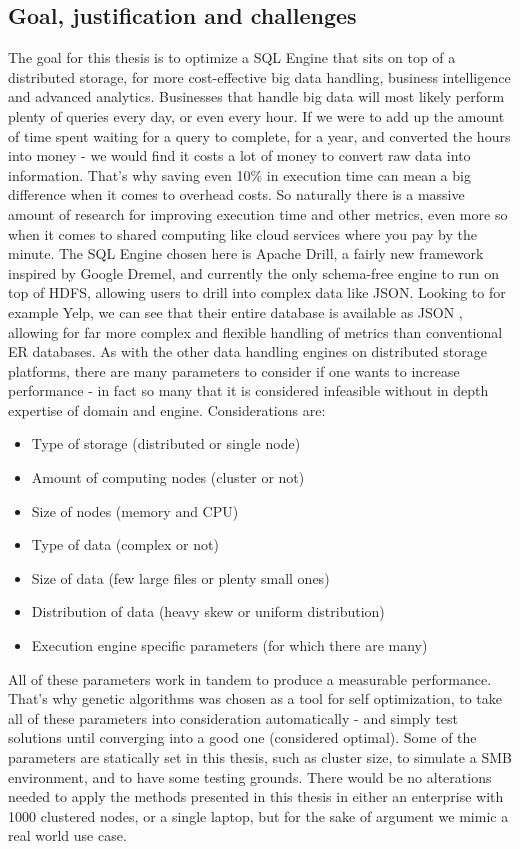\documentclass[a4paper,english]{report}
\begin{document}
		\subsection{Goal, justification and challenges}
		The goal for this thesis is to optimize a SQL Engine that sits on top of a distributed storage, for more cost-effective big data handling, business intelligence and advanced analytics. Businesses that handle big data will most likely perform plenty of queries every day, or even every hour. If we were to add up the amount of time spent waiting for a query to complete, for a year, and converted the hours into money - we would find it costs a lot of money to convert raw data into information. That's why saving even 10\% in execution time can mean a big difference when it comes to overhead costs. So naturally there is a massive amount of research for improving execution time and other metrics, even more so when it comes to shared computing like cloud services where you pay by the minute. The SQL Engine chosen here is Apache Drill, a fairly new framework inspired by Google Dremel, and currently the only schema-free engine to run on top of HDFS, allowing users to drill into complex data like JSON. Looking to for example Yelp, we can see that their entire database is available as JSON \cite{yelp}, allowing for far more complex  and flexible handling of metrics than conventional ER databases. As with the other data handling engines on distributed storage platforms, there are many parameters to consider if one wants to increase performance - in fact so many that it is considered infeasible without in depth expertise of domain and engine. Considerations are:
		\begin{itemize}
			\item Type of storage (distributed or single node)
			\item Amount of computing nodes (cluster or not)
			\item Size of nodes (memory and CPU)
			\item Type of data (complex or not)
			\item Size of data (few large files or plenty small ones)
			\item Distribution of data (heavy skew or uniform distribution)
			\item Execution engine specific parameters (for which there are many)
		\end{itemize}
		All of these parameters work in tandem to produce a measurable performance. That's why genetic algorithms was chosen as a tool for self optimization, to take all of these parameters into consideration automatically - and simply test solutions until converging into a good one (considered optimal). Some of the parameters are statically set in this thesis, such as cluster size, to simulate a SMB environment, and to have some testing grounds. There would be no alterations needed to apply the methods presented in this thesis in either an enterprise with 1000 clustered nodes, or a single laptop, but for the sake of argument we mimic a real world use case.
\end{document}
